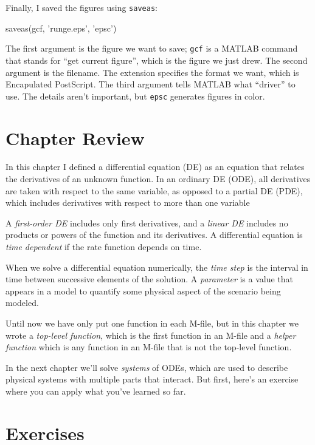 Finally, I saved the figures using {\tt saveas}:

\begin{code}
saveas(gcf, 'runge.eps', 'epsc')
\end{code}

The first argument is the figure we want to save; {\tt gcf} is a MATLAB command that stands for ``get current figure'', which is the figure we just drew.  The second argument is the filename.  The extension specifies the format we want, which is Encapulated PostScript.  The third argument tells MATLAB what ``driver'' to use.  The details aren't important, but {\tt epsc} generates figures in color.


\section{Chapter Review}

In this chapter I defined a differential equation (DE) as an equation that relates the
derivatives of an unknown function.  
In an ordinary DE (ODE), all derivatives are taken with
respect to the same variable, as opposed to a partial DE (PDE), which includes derivatives with respect to more than one variable

A {\em first-order DE} includes only first derivatives, and a {\em linear DE} includes no products or powers of the function and its derivatives.
A differential equation is {\em time dependent} if the rate function depends on time.

When we solve a differential equation numerically, the {\em time step} is the interval in time between successive elements of the solution.
A {\em parameter} is a value that appears in a model to quantify some
physical aspect of the scenario being modeled.

Until now we have only put one function in each M-file, but in this chapter we wrote a {\em top-level function}, which is the first function in an M-file and a {\em helper function} which is any function in an M-file that is not the top-level function.

In the next chapter we'll solve {\em systems} of ODEs, which are used to describe physical systems with multiple parts that interact.
But first, here's an exercise where you can apply what you've learned so far.


\section{Exercises}

